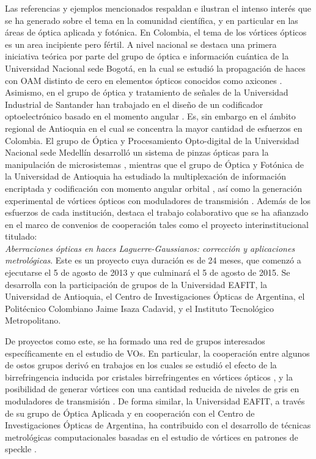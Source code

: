 Las referencias y ejemplos mencionados respaldan e ilustran el
intenso interés que se ha generado sobre el tema en la 
comunidad científica, y en particular en las áreas de óptica
aplicada y fotónica.  En Colombia, el tema de los vórtices ópticos es
un area  incipiente pero fértil. A nivel nacional se destaca una primera
iniciativa teórica por parte del grupo de óptica e información
cuántica de la  Universidad Nacional sede
Bogotá, en la cual se estudió la propagación de haces con OAM distinto de
cero en elementos ópticos conocidos como axicones
. Asimismo, en el grupo de óptica y tratamiento de
señales de la Universidad Industrial de Santander han trabajado en el diseño de un codificador optoelectrónico
basado en el momento angular . Es,
sin embargo en el ámbito regional de Antioquia en el cual se
concentra la mayor cantidad de esfuerzos en Colombia.  El grupo de
Óptica y Procesamiento Opto-digital de la Universidad 
Nacional sede Medellín desarrolló un sistema de pinzas ópticas para la
manipulación de microsistemas , mientras que el grupo de Óptica y Fotónica
de la Universidad de Antioquia ha estudiado la multiplexación de
información encriptada y codificación con momento angular
orbital , así como la generación experimental de
vórtices ópticos con moduladores de transmisión
. Además de los esfuerzos
de cada institución, destaca el trabajo colaborativo que se ha afianzado en el marco de convenios de
cooperación tales como el proyecto interinstitucional titulado:\\
\textit{Aberraciones ópticas en haces Laguerre-Gaussianos: corrección
  y aplicaciones metrológicas}. Este es un proyecto cuya duración es de 24 meses, que
comenzó a ejecutarse el 5 de agosto de 2013 y que culminará el 5 de
agosto de 2015. Se desarrolla con la participación de grupos de la
Universidad EAFIT, la Universidad de Antioquia, el Centro de
Investigaciones Ópticas de Argentina, el Politécnico Colombiano Jaime
Isaza Cadavid, y el Instituto Tecnológico Metropolitano. 

De proyectos como este, se ha formado una red de grupos interesados
específicamente en el estudio de VOs. En particular,
la cooperación entre algunos de ostos grupos derivó en trabajos en los
cuales se estudió el efecto de la birrefringencia inducida por
cristales birrefringentes en vórtices ópticos , y la
posibilidad de generar vórtices con una cantidad reducida de niveles
de gris en moduladores de transmisión . De forma
similar, la Universidad EAFIT, a través de su grupo de Óptica Aplicada
y en cooperación con el Centro de Investigaciones Ópticas de
Argentina,  ha contribuido con el desarrollo de técnicas metrológicas
computacionales basadas en el estudio de  vórtices en patrones de
speckle
. 



